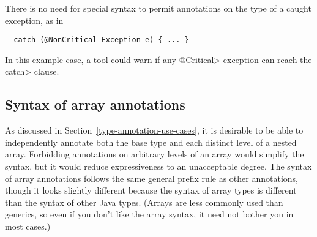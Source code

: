 \documentclass[10pt]{article}
\begin{document}
There is no need for special syntax to permit annotations on the type of a
caught exception, as in

\begin{Verbatim}
  catch (@NonCritical Exception e) { ... }
\end{Verbatim}

\noindent
In this example case, a tool could warn if any \<@Critical> exception can
reach the \<catch> clause.


% 
% 
% 
% 
% 
% 
% 
% 
% 



\subsection{Syntax of array annotations\label{array-syntax}}

As discussed in Section~\ref{type-annotation-use-cases}, it is
desirable to be able to independently annotate both the base type and
each distinct level of a nested array.
Forbidding annotations on arbitrary levels of an array would simplify the
syntax, but it would reduce expressiveness to an unacceptable degree.
The syntax of array annotations follows the same general prefix rule as
other annotations, though it looks slightly different because the syntax
of array types is different than the syntax of other Java types.
(Arrays are less commonly used than generics, so even if you don't like the
array syntax, it need not bother you in most cases.)
\end{document}

